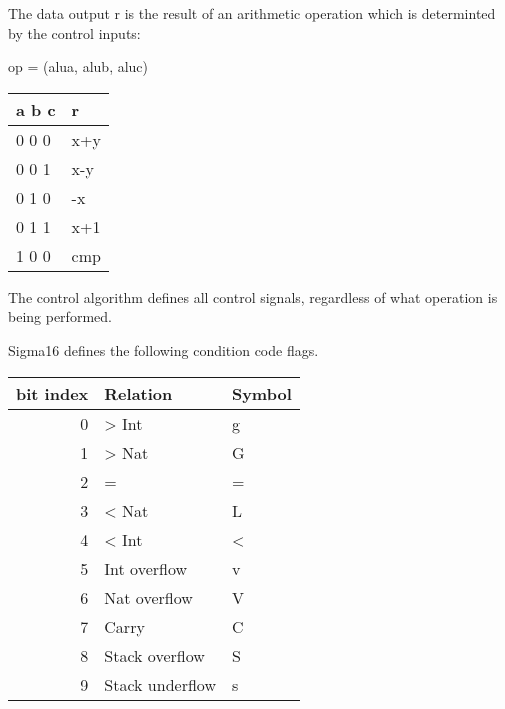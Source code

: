 \documentclass[11pt]{article}
\begin{document}
The data output r is the result of an arithmetic operation which
is determinted by the control inputs:


op = (alua, alub,  aluc)

\begin{center}
\begin{tabular}{ll}
a b c & r\\
\hline
0 0 0 & x+y\\
0 0 1 & x-y\\
0 1 0 & -x\\
0 1 1 & x+1\\
1 0 0 & cmp\\
\end{tabular}
\end{center}

The control algorithm defines all control signals, regardless of what
operation is being performed.


Sigma16 defines the following condition code flags.

\begin{center}
\begin{tabular}{rll}
bit index & Relation & Symbol\\
\hline
0 & > Int & g\\
1 & > Nat & G\\
2 & = & =\\
3 & < Nat & L\\
4 & < Int & <\\
5 & Int overflow & v\\
6 & Nat overflow & V\\
7 & Carry & C\\
8 & Stack overflow & S\\
9 & Stack underflow & s\\
\end{tabular}
\end{center}
\end{document}
